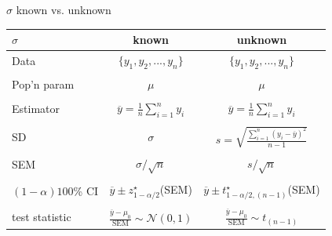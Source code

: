 \documentclass[10pt]{beamer}\usepackage[]{graphicx}\usepackage[]{color}
\begin{document}
\begin{frame}{$\sigma$ known vs. unknown}
	\begin{center}
		\begin{tabular}{|l|c|c|} \hline
			$\sigma$& known & unknown \\ \hline Data & $\{y_1,y_2,...,y_n\}$ &
			$\{y_1,y_2,...,y_n\}$\\
			& & \\
			Pop'n param & $\mu$ & $\mu$\\
			& & \\
			Estimator & $\overline{y} = \frac{1}{n}\sum_{i=1}^n y_i$ & $\overline{y} = \frac{1}{n}\sum_{i=1}^n y_i$ \\
			& & \\
			SD & $\sigma$ & $s = \sqrt{\frac{\sum_{i=1}^n(y_i-\overline{y})^2}{n-1}}$ \\
			& & \\
			SEM & $\sigma/\sqrt{n}$ & $s / \sqrt{n}$ \\
			& & \\
			$(1-\alpha)100$\% CI & $\overline{y} \pm z^\star_{1-\alpha/2}$(SEM) & $\overline{y} \pm t^\star_{1-\alpha/2, (n-1)}$(SEM) \\
			& & \\
			test statistic & $\frac{\overline{y}-\mu_0}{\textrm{SEM}}\sim \mathcal{N}(0,1)$ &
			$\frac{\overline{y}-\mu_0}{\textrm{SEM}}\sim t_{(n-1)}$ \\
			\hline
		\end{tabular}
	\end{center}
\end{frame}
\end{document}
